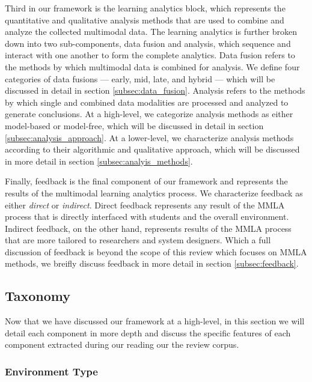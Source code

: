 \documentclass[manuscript,screen,review]{acmart}
\begin{document}
Third in our framework is the learning analytics block, which represents the quantitative and qualitative analysis methods that are used to combine and analyze the collected multimodal data. The learning analytics is further broken down into two sub-components, data fusion and analysis, which sequence and interact with one another to form the complete analytics. Data fusion refers to the methods by which multimodal data is combined for analysis. We define four categories of data fusions --- early, mid, late, and hybrid --- which will be discussed in detail in section \ref{subsec:data_fusion}. Analysis refers to the methods by which single and combined data modalities are processed and analyzed to generate conclusions. At a high-level, we categorize analysis methods as either model-based or model-free, which will be discussed in detail in section \ref{subsec:analysis_approach}. At a lower-level, we characterize analysis methods according to their algorithmic and qualitative approach, which will be discussed in more detail in section \ref{subsec:analyis_methods}.

Finally, feedback is the final component of our framework and represents the results of the multimodal learning analytics process. We characterize feedback as either \textit{direct} or \textit{indirect}. Direct feedback represents any result of the MMLA process that is directly interfaced with students and the overall environment. Indirect feedback, on the other hand, represents results of the MMLA process that are more tailored to researchers and system designers. Which a full discussion of feedback is beyond the scope of this review which focuses on MMLA methods, we breifly discuss feedback in more detail in section \ref{subsec:feedback}.




\subsection{Taxonomy}\label{subsec:taxonomy}
Now that we have discussed our framework at a high-level, in this section we will detail each component in more depth and discuss the specific features of each component extracted during our reading our the review corpus.

\subsubsection{Environment Type}\label{subsec:environment_type} %
\end{document}
